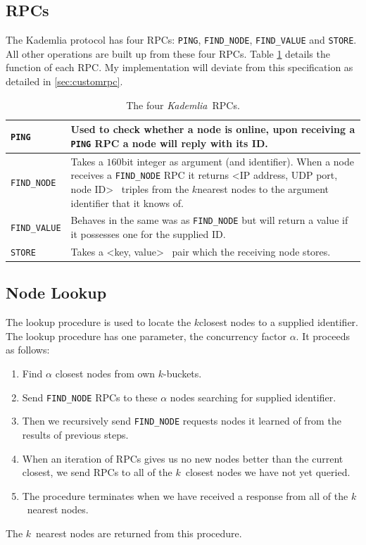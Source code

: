 \documentclass[10pt,twoside,notitlepage,a4paper]{report}
\newcommand{\kademlia}{\emph{Kademlia}}
\newcommand{\K}{$k$}
\begin{document}
	\subsection{RPCs}
	The Kademlia protocol has four RPCs: \texttt{PING}, \texttt{FIND\_NODE}, \texttt{FIND\_VALUE} and \texttt{STORE}. All other operations are built up from these four RPCs. Table \ref{tab:rpcs} details the function of each RPC. My implementation will deviate from this specification as detailed in \cref{sec:customrpc}.
	
	\begin{table}
		\begin{tabularx}{\textwidth}{| l | X |}
			\hline
			\texttt{PING} & Used to check whether a node is online, upon receiving a \texttt{PING} RPC a node will reply with its ID.\\
			\hline
			\texttt{FIND\_NODE} & Takes a $160$bit integer as argument (and identifier). When a node receives a \texttt{FIND\_NODE} RPC it returns \textless IP address, UDP port, node ID\textgreater~ triples from the \K nearest nodes to the argument identifier that it knows of.\\
			\hline
			\texttt{FIND\_VALUE} & Behaves in the same was as \texttt{FIND\_NODE} but will return a value if it possesses one for the supplied ID.\\
			\hline
			\texttt{STORE} & Takes a \textless key, value\textgreater~ pair which the receiving node stores.\\
			\hline
		\end{tabularx}
		\caption{The four \kademlia~RPCs.}
		\label{tab:rpcs}
	\end{table}
	
	\subsection{Node Lookup}
	The lookup procedure is used to locate the \K closest nodes to a supplied identifier. The lookup procedure has one parameter, the concurrency factor $\alpha$. It proceeds as follows:
	\begin{enumerate}
		\item Find $\alpha$ closest nodes from own \K-buckets.
		\item Send \texttt{FIND\_NODE} RPCs to these $\alpha$ nodes searching for supplied identifier.
		\item Then we recursively send \texttt{FIND\_NODE} requests nodes it learned of from the results of previous steps.
		\item When an iteration of RPCs gives us no new nodes better than the current closest, we send RPCs to all of the \K~closest nodes we have not yet queried.
		\item The procedure terminates when we have received a response from all of the \K~nearest nodes.
	\end{enumerate}
	The \K~nearest nodes are returned from this procedure.
	
\end{document}
